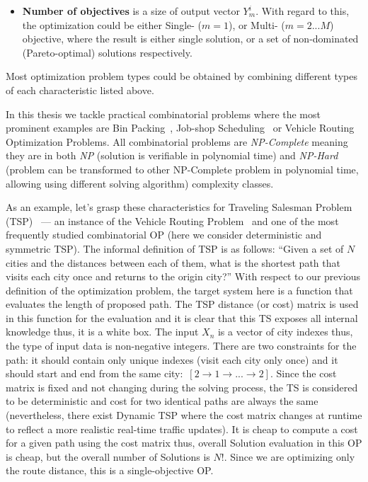 \begin{itemize}[itemsep=8pt]
	\item \textbf{Number of objectives} is a size of output vector $Y_m^i$. With regard to this, the optimization could be either Single- ($m=1$), or Multi- ($m=2...M$) objective, where the result is either single solution, or a set of non-dominated (Pareto-optimal) solutions respectively.
\end{itemize}

Most optimization problem types could be obtained by combining different types of each characteristic listed above.

In this thesis we tackle practical combinatorial problems where the most prominent examples are Bin Packing~\cite{martello1990bin}, Job-shop Scheduling~\cite{blazewicz1996job} or Vehicle Routing~\cite{toth2002vehicle} Optimization Problems.
All combinatorial problems are \emph{NP-Complete} meaning they are in both \emph{NP} (solution is verifiable in polynomial time) and \emph{NP-Hard} (problem can be transformed to other NP-Complete problem in polynomial time, allowing using different solving algorithm) complexity classes\cite{garey1979computers}.

As an example, let's grasp these characteristics for Traveling Salesman Problem (TSP)~\cite{applegate2006traveling} — an instance of the Vehicle Routing Problem~\cite{laporte1992vehicle} and one of the most frequently studied combinatorial OP (here we consider deterministic and symmetric TSP).
The informal definition of TSP is as follows: ``Given a set of $N$ cities and the distances between each of them, what is the shortest path that visits each city once and returns to the origin city?''
With respect to our previous definition of the optimization problem, the target system here is a function that evaluates the length of proposed path. The TSP distance (or cost) matrix is used in this function for the evaluation and it is clear that this TS exposes all internal knowledge thus, it is a white box.
The input $X_n$ is a vector of city indexes thus, the type of input data is non-negative integers. There are two constraints for the path: it should contain only unique indexes (visit each city only once) and it should start and end from the same city:~$[2 \rightarrow 1 \rightarrow ... \rightarrow 2]$.
Since the cost matrix is fixed and not changing during the solving process, the TS is considered to be deterministic and cost for two identical paths are always the same (nevertheless, there exist Dynamic TSP where the cost matrix changes at runtime to reflect a more realistic real-time traffic updates\cite{cheong2011dynamic}).
It is cheap to compute a cost for a given path using the cost matrix thus, overall Solution evaluation in this OP is cheap, but the overall number of Solutions is $N!$. Since we are optimizing only the route distance, this is a single-objective OP.


